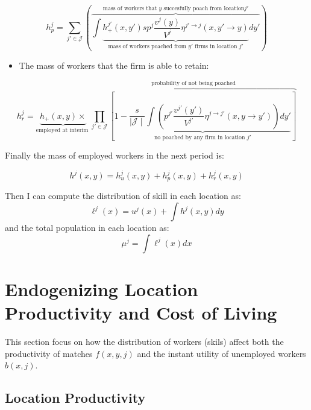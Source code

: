\documentclass[
  letterpaper,
  DIV=11,
  numbers=noendperiod]{scrreprt}
\providecommand{\tightlist}{%
  \setlength{\itemsep}{0pt}\setlength{\parskip}{0pt}}\usepackage{longtable,booktabs,array}
\begin{document}
\begin{equation}
h^j_{p} = \sum_{j'\in \mathcal{J}}\left(\overbrace{\int\underbrace{ h_{+}^{j'}(x,y')sp^j\frac{v^{j}(y)}{V^{j}}\eta^{j'\to j}(x,y'\to y)}_{\text{mass of workers poached from } y' \text{ firms in location } j'}dy'}^{\text{mass of workers that } y \text{ succesfully poach from location} j'} \right)
\end{equation}

\begin{itemize}
\tightlist
\item
  The mass of workers that the firm is able to retain:
\end{itemize}

\begin{equation}
h^j_{r} = \underbrace{h_{+}(x,y)  \times }_{\text{employed at interim }} \overbrace{\prod_{j'\in\mathcal{J}}\left[ \underbrace{1 - \frac{s}{\mid \mathcal{J} \mid}\int\left( p^{j'}\frac{v^{j'}(y')}{V^{j'}} \eta^{j\to j'}(x,y\to y')\right)dy'}_{\text{no poached by any firm in location }j'} \right]}^{\text{probability of not being poached}}
\end{equation}

Finally the mass of employed workers in the next period is:

\begin{equation}
\label{eq-law-of-motion-emp}
h^j(x,y) =  h^j_{u}(x,y) + h^j_{p}(x,y) + h^j_{r}(x,y) 
\end{equation}

Then I can compute the distribution of skill in each location as:
\[\ell^j(x) = u^j(x) + \int h^j(x,y)dy\] and the total population in
each location as: \[\mu^j = \int \ell^j(x)dx\]


\hypertarget{endogenizing-location-productivity-and-cost-of-living}{%
\chapter{Endogenizing Location Productivity and Cost of
Living}\label{endogenizing-location-productivity-and-cost-of-living}}

This section focus on how the distribution of workers (skils) affect
both the productivity of matches \(f(x,y,j)\) and the instant utility of
unemployed workers \(b(x,j)\).

\hypertarget{sec-agglomeration_effect}{%
\section{Location Productivity}\label{sec-agglomeration_effect}}
\end{document}
